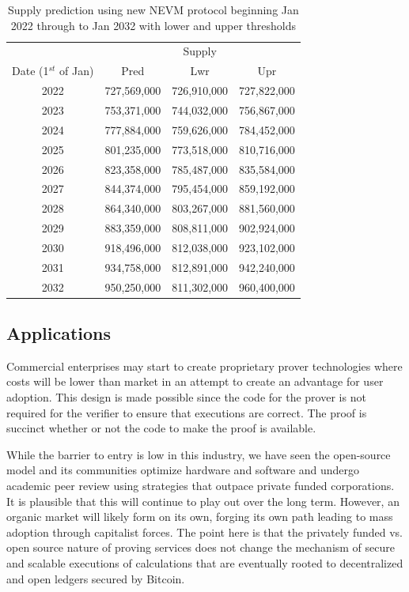 \documentclass[peerreview]{ieeesyscoin}
\begin{document}
\begin{table}[h!]
\centering
\begin{tabular}{ |c|c|c|c| } 
\hline
 & \multicolumn{3}{|c|}{ Supply } \\
 Date (1$^{st}$ of Jan) & Pred & Lwr & Upr \\
\hline
2022 & 727,569,000 & 726,910,000 & 727,822,000 \\
2023 & 753,371,000 & 744,032,000 & 756,867,000 \\
2024 & 777,884,000 & 759,626,000 & 784,452,000 \\
2025 & 801,235,000  & 773,518,000 & 810,716,000 \\
2026 & 823,358,000  & 785,487,000 & 835,584,000 \\
2027 & 844,374,000 & 795,454,000 & 859,192,000 \\
2028 & 864,340,000 & 803,267,000 & 881,560,000 \\
2029 & 883,359,000 & 808,811,000 & 902,924,000 \\
2030 & 918,496,000 & 812,038,000 & 923,102,000 \\
2031 & 934,758,000 & 812,891,000 & 942,240,000 \\
2032 & 950,250,000 & 811,302,000 & 960,400,000 \\
\hline
\end{tabular}
\caption{Supply prediction using new NEVM protocol beginning Jan 2022 through to Jan 2032 with lower and upper thresholds}
\label{table:pow_vs_pos}
\end{table}

\subsection{Applications}

Commercial enterprises may start to create proprietary prover technologies where costs will be lower than market in an attempt to create an advantage for user adoption. This design is made possible since the code for the prover is not required for the verifier to ensure that executions are correct. The proof is succinct whether or not the code to make the proof is available.

While the barrier to entry is low in this industry, we have seen the open-source model and its communities optimize hardware and software and undergo academic peer review using strategies  that outpace private funded corporations. It is plausible that this will continue to play out over the long term. However, an organic market will likely form on its own, forging its own path leading to mass adoption through capitalist forces. The point here is that the privately funded vs. open source nature of proving services does not change the mechanism of secure and scalable executions of calculations that are eventually rooted to decentralized and open ledgers secured by Bitcoin.
\end{document}
